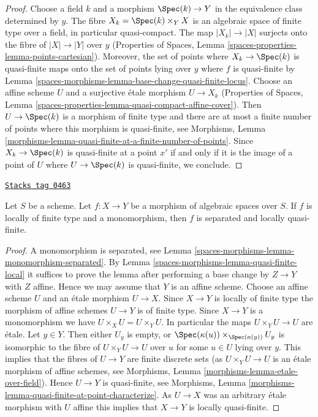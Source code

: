 \begin{proof}
Choose a field $k$ and a morphism $\Spec(k) \to Y$ in the equivalence
class determined by $y$. The fibre $X_k = \Spec(k) \times_Y X$ is an
algebraic space of finite type over a field, in particular quasi-compact.
The map $|X_k| \to |X|$ surjects onto the fibre of $|X| \to |Y|$
over $y$ (Properties of Spaces, Lemma
\ref{spaces-properties-lemma-points-cartesian}).
Moreover, the set of points where $X_k \to \Spec(k)$ is
quasi-finite maps onto the set of points lying over $y$ where
$f$ is quasi-finite by Lemma \ref{spaces-morphisms-lemma-base-change-quasi-finite-locus}.
Choose an affine scheme $U$ and a surjective \'etale morphism $U \to X_k$
(Properties of Spaces, Lemma
\ref{spaces-properties-lemma-quasi-compact-affine-cover}).
Then $U \to \Spec(k)$ is a morphism of finite type and there are at
most a finite number of points where this morphism is quasi-finite,
see Morphisms, Lemma
\ref{morphisms-lemma-quasi-finite-at-a-finite-number-of-points}.
Since $X_k \to \Spec(k)$ is quasi-finite at a point $x'$ if and only
if it is the image of a point of $U$ where $U \to \Spec(k)$ is
quasi-finite, we conclude.
\end{proof}

\begin{lemma}
\label{spaces-morphisms-lemma-monomorphism-loc-finite-type-loc-quasi-finite}
\href{https://stacks.math.columbia.edu/tag/0463}{\texttt{Stacks tag 0463}}

Let $S$ be a scheme.
Let $f : X \to Y$ be a morphism of algebraic spaces over $S$.
If $f$ is locally of finite type and a monomorphism, then $f$
is separated and locally quasi-finite.
\end{lemma}

\begin{proof}
A monomorphism is separated, see
Lemma \ref{spaces-morphisms-lemma-monomorphism-separated}.
By
Lemma \ref{spaces-morphisms-lemma-quasi-finite-local}
it suffices to prove the lemma after performing a base change
by $Z \to Y$ with $Z$ affine. Hence we may assume that $Y$ is an
affine scheme. Choose an affine scheme $U$ and an \'etale morphism
$U \to X$. Since $X \to Y$ is locally of finite type the morphism
of affine schemes $U \to Y$ is of finite type.
Since $X \to Y$ is a monomorphism we have $U \times_X U = U \times_Y U$.
In particular the maps $U \times_Y U \to U$ are \'etale.
Let $y \in Y$. Then either $U_y$ is empty, or
$\Spec(\kappa(u)) \times_{\Spec(\kappa(y))} U_y$
is isomorphic to the fibre of $U \times_Y U \to U$ over $u$ for
some $u \in U$ lying over $y$. This implies that the fibres of
$U \to Y$ are finite discrete sets (as $U \times_Y U \to U$
is an \'etale morphism of affine schemes, see
Morphisms, Lemma \ref{morphisms-lemma-etale-over-field}).
Hence $U \to Y$ is quasi-finite, see
Morphisms, Lemma \ref{morphisms-lemma-quasi-finite-at-point-characterize}.
As $U \to X$ was an arbitrary \'etale morphism with $U$ affine
this implies that $X \to Y$ is locally quasi-finite.
\end{proof}

